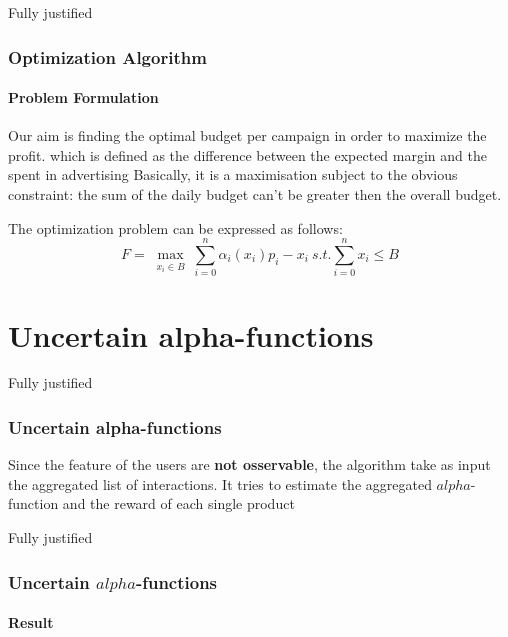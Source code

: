 \documentclass{beamer}
\begin{document}
\begin{frame}{Fully justified}

\frametitle{Optimization Algorithm}
\framesubtitle{Problem Formulation}
Our aim is finding the optimal budget per campaign in order to maximize the profit.
which is defined as the difference between the expected margin and the spent in advertising
Basically, it is a maximisation subject to the obvious constraint: the sum of the daily budget can't be greater then the overall budget.

The optimization problem can be expressed as follows:
\begin{displaymath}
F=\max_{\substack{x_i\in B}} \sum_{i=0}^n \alpha_i(x_i)p_i-x_i \ s.t. \sum_{i=0}^n x_i\leq B
\end{displaymath}

\end{frame}



\AtBeginSection[]
{
\begin{frame}{}
    \tableofcontents[currentsection]
\end{frame}
}


\section{Uncertain alpha-functions}

\begin {frame}{Fully justified}

\frametitle{Uncertain alpha-functions}
Since the feature of the users are \textbf{not osservable}, the algorithm take as input the aggregated list of interactions.
It tries to estimate the aggregated $alpha$-function and the reward of each single product

\end{frame}


\begin {frame}{Fully justified}

\frametitle{Uncertain $alpha$-functions}
\framesubtitle{Result}

\end{frame}
\end{document}
